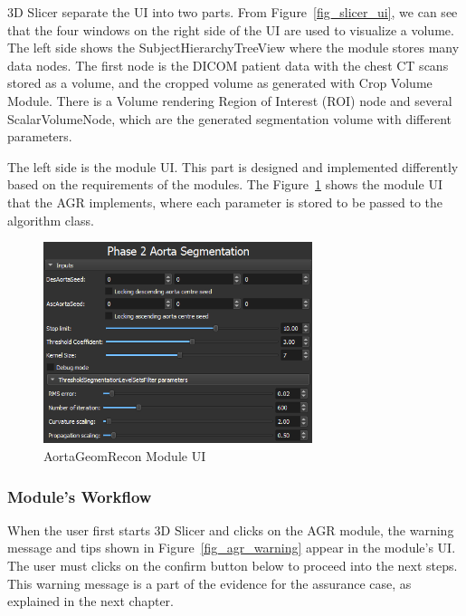 3D Slicer separate the UI into two parts. From Figure~\ref{fig_slicer_ui}, we can see that the four windows on the right side of the UI are used to visualize a volume. The left side shows the SubjectHierarchyTreeView where the module stores many data nodes. The first node is the DICOM patient data with the chest CT scans stored as a volume, and the cropped volume as generated with Crop Volume Module. There is a Volume rendering Region of Interest (ROI) node and several ScalarVolumeNode, which are the generated segmentation volume with different parameters.

The left side is the module UI. This part is designed and implemented differently based on the requirements of the modules. The Figure~\ref{fig_module_ui} shows the module UI that the AGR implements, where each parameter is stored to be passed to the algorithm class.

\begin{figure}[H]
    \centering
    \includegraphics[width=0.7\textwidth]{figures/AGR/Module_UI.png}
    \caption[AortaGeomRecon Module UI]{AortaGeomRecon Module UI}
    \label{fig_module_ui}
\end{figure}


\subsubsection{Module's Workflow} \label{module_workflow}
When the user first starts 3D Slicer and clicks on the AGR module, the warning message and tips shown in Figure~\ref{fig_agr_warning} appear in the module's UI. The user must clicks on the confirm button below to proceed into the next steps. This warning message is a part of the evidence for the assurance case, as explained in the next chapter.

